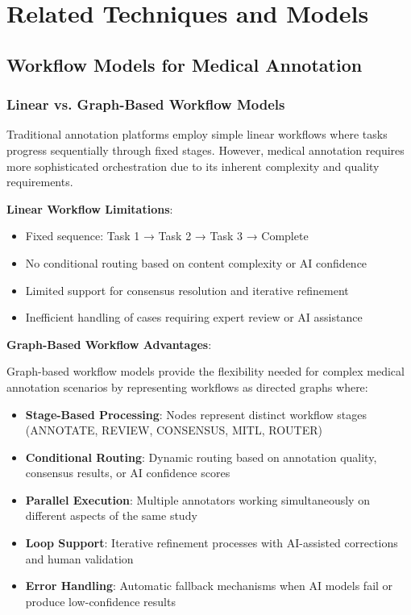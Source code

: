 \section{Related Techniques and Models}
\label{sec:related-techniques}

\subsection{Workflow Models for Medical Annotation}
\label{subsec:workflow-models}

\subsubsection{Linear vs. Graph-Based Workflow Models}

Traditional annotation platforms employ simple linear workflows where tasks progress sequentially through fixed stages. However, medical annotation requires more sophisticated orchestration due to its inherent complexity and quality requirements.

\textbf{Linear Workflow Limitations}:
\begin{itemize}
    \item Fixed sequence: Task 1 → Task 2 → Task 3 → Complete
    \item No conditional routing based on content complexity or AI confidence
    \item Limited support for consensus resolution and iterative refinement
    \item Inefficient handling of cases requiring expert review or AI assistance
\end{itemize}

\textbf{Graph-Based Workflow Advantages}:

Graph-based workflow models \cite{aalst2003workflow} provide the flexibility needed for complex medical annotation scenarios by representing workflows as directed graphs where:

\begin{itemize}
    \item \textbf{Stage-Based Processing}: Nodes represent distinct workflow stages (ANNOTATE, REVIEW, CONSENSUS, MITL, ROUTER)
    \item \textbf{Conditional Routing}: Dynamic routing based on annotation quality, consensus results, or AI confidence scores
    \item \textbf{Parallel Execution}: Multiple annotators working simultaneously on different aspects of the same study
    \item \textbf{Loop Support}: Iterative refinement processes with AI-assisted corrections and human validation
    \item \textbf{Error Handling}: Automatic fallback mechanisms when AI models fail or produce low-confidence results
\end{itemize}

